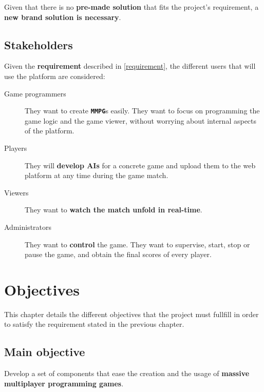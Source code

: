 \documentclass[a4paper,11pt,titlepage,abstract,numbers=noenddot,automark,mnsy,intlimits,rgb,dvipsnames]{report}
\begin{document}
Given that there is no \textbf{pre-made solution} that fits the project's requirement, a \textbf{new brand solution is necessary}.
\section{Stakeholders}
Given the \textbf{requirement} described in \autoref{requirement}, the different users that will use the platform are considered:
\begin{description}
\item[Game programmers]
They want to create \textbf{\texttt{MMPG}}s easily. They want to focus on programming the game logic and the
  game viewer, without worrying about internal aspects of the platform.
\item[Players]
They will \textbf{develop \texttt{}AI\texttt{}s} for a concrete game and upload them to the web platform at any time during
  the game match.
\item[Viewers]
They want to \textbf{watch the match unfold in real-time}.
\item[Administrators]
They want to \textbf{control} the game. They want to supervise, start, stop or pause the game, and obtain
  the final scores of every player.
\end{description}
\clearpage
\chapter{Objectives}
\label{specification}
This chapter details the different objectives that the project must fullfill in order to satisfy the requirement stated in
the previous chapter.
\section{Main objective}
Develop a set of components that ease the creation and the usage of \textbf{massive multiplayer programming games}.
\end{document}
